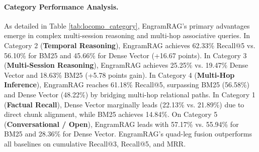 \documentclass[conference]{IEEEtran}
\begin{document}
\begin{table}[t]
\centering
{}
\caption{Category-wise Recall@5 (\%) on LoCoMo across all 1,982 questions. Bold indicates the top-performing model in each category.}
\label{tab:locomo_category}
\end{table}

\paragraph{Category Performance Analysis.}
As detailed in Table \ref{tab:locomo_category}, EngramRAG's primary advantages emerge in complex multi-session reasoning and multi-hop associative queries. In Category 2 (\textbf{Temporal Reasoning}), EngramRAG achieves 62.33\% Recall@5 vs. 56.10\% for BM25 and 45.66\% for Dense Vector (+16.67 points). In Category 3 (\textbf{Multi-Session Reasoning}), EngramRAG achieves 25.25\% vs. 19.47\% Dense Vector and 18.63\% BM25 (+5.78 points gain). In Category 4 (\textbf{Multi-Hop Inference}), EngramRAG reaches 61.18\% Recall@5, surpassing BM25 (56.58\%) and Dense Vector (48.22\%) by bridging multi-hop relational paths. In Category 1 (\textbf{Factual Recall}), Dense Vector marginally leads (22.13\% vs. 21.89\%) due to direct chunk alignment, while BM25 achieves 14.84\%. On Category 5 (\textbf{Conversational / Open}), EngramRAG leads with 57.17\% vs. 55.94\% for BM25 and 28.36\% for Dense Vector. EngramRAG's quad-leg fusion outperforms all baselines on cumulative Recall@3, Recall@5, and MRR.

\enlargethispage{2\baselineskip}
\end{document}
